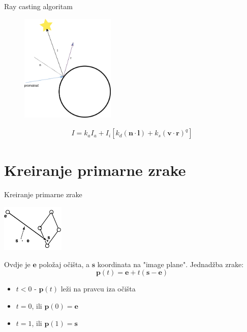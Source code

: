 \documentclass[9pt]{beamer}
\begin{document}
\begin{frame}{Ray casting algoritam}
\begin{figure}
	\includegraphics[width=0.4\textwidth]{./slike/sjencanje.png}
\end{figure}
\begin{align*}
I = k_aI_a + I_i\left[k_d\left(\mathbf{n}\cdot\mathbf{l}\right)+
k_s\left(\mathbf{v}\cdot\mathbf{r}\right)^q\right]
\end{align*}
\end{frame}
\section{Kreiranje primarne zrake}
\begin{frame}{Kreiranje primarne zrake}
\begin{center}
\includegraphics[width=3cm]{slike/ray_from_eye.png}
\end{center}
Ovdje je $\textbf{e}$ položaj očišta, a $\textbf{s}$ koordinata na "image plane".
Jednadžba zrake: 
$$\textbf{p}(t) = \textbf{e} + t(\textbf{s} - \textbf{e})$$
\begin{itemize}
\item $t<0$ - $\textbf{p}(t)$ leži na pravcu iza očišta
\item $t=0$, ili $\textbf{p}(0) = \textbf{e}$
\item $t=1$, ili $\textbf{p}(1) = \textbf{s}$
\end{itemize}
\end{frame}
\end{document}
